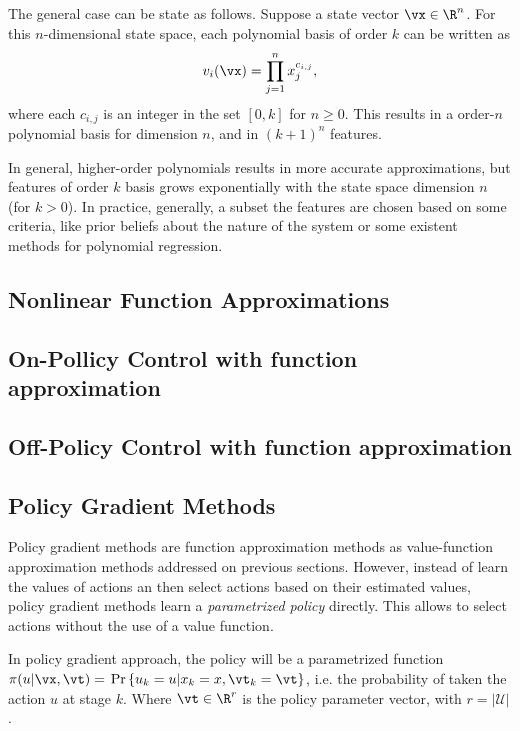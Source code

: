 The general case can be state as follows.
Suppose a state vector $\vx \in \R^n$. For this $n$-dimensional state space, each polynomial basis of order  $k$ can be written as
 \begin{equation}
   v_i(\vx) = \prod_{j=1}^{n}x_j^{c_{i,j}} ,
\end{equation}
where each $c_{i,j}$ is an integer in the set $[0,k]$ for $n\ge 0$. This results in a order-$n$ polynomial basis for dimension $n$, and in  $(k+1)^{n}$ features.

In general, higher-order polynomials results in more accurate approximations, but features of order $k$ basis grows exponentially with the state space dimension $n$ (for $k>0$). In practice, generally, a subset the features are chosen based on some criteria, like prior beliefs about the nature of the system or some existent methods for polynomial regression.

\subsection{Nonlinear Function Approximations}
\subsection{On-Pollicy Control with function approximation}
\subsection{Off-Policy Control with function approximation}
\label{sec:offPoliceControlFA}




\subsection{Policy Gradient Methods}
\label{sec:PGM}


Policy gradient methods are function approximation methods as value-function approximation methods addressed on previous sections. However, instead of learn the values of actions an then select actions based on their estimated values, policy gradient methods learn a \textit{parametrized policy} directly. This allows to select actions without the use of a value function.

In policy gradient approach, the policy will be a parametrized function $\pi(u|\vx,\vt) =$ $\text{Pr}\left\{u_k=u | x_k = x, \vt_k = \vt\right\}$, i.e. the probability of taken the action $u$ at stage $k$. Where $\vt \in \R^{r}$ is the policy parameter vector, with $r = |\mathcal{U}|$.

